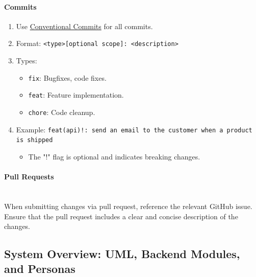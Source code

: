 \documentclass[12pt,a4paper]{article}
\begin{document}
\begin{spacing}{1.5}
    \paragraph{Commits}
    \begin{enumerate}
        \item Use \href{https://www.conventionalcommits.org/en/v1.0.0/}{Conventional Commits}
              for all commits.
        \item Format: \texttt{<type>[optional scope]: <description>}
        \item Types:
              \begin{itemize}
                  \item \texttt{fix}: Bugfixes, code fixes.
                  \item \texttt{feat}: Feature implementation.
                  \item \texttt{chore}: Code cleanup.
              \end{itemize}
        \item Example: \texttt{feat(api)!: send an email to the customer when a product is
                  shipped}
              \begin{itemize}
                  \item The "!" flag is optional and indicates breaking changes.
              \end{itemize}
    \end{enumerate}

    \paragraph{Pull Requests} \mbox{} \\ \indent
    When submitting changes via pull request, reference the relevant GitHub issue. Ensure that the pull request includes a clear and concise description of the changes.

    \subsection{System Overview: UML, Backend Modules, and Personas}


\end{spacing}
\end{document}
